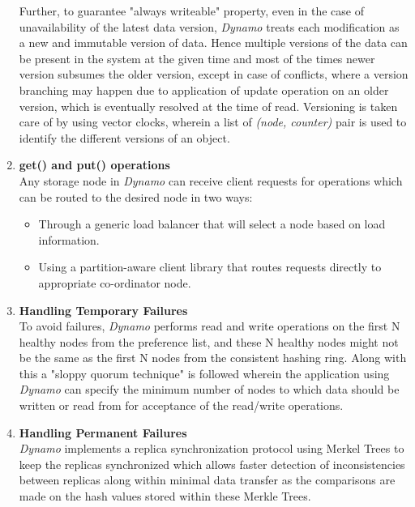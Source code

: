 \documentclass[12pt, a4paper]{article}
\begin{document}
\begin{enumerate}
Further, to guarantee "always writeable" property, even in the case of unavailability of the latest data version, \textit{Dynamo}\cite{DeCandia:2007:DAH:1294261.1294281} treats each modification as a new and immutable version of data. Hence multiple versions of the data can be present in the system at the given time and most of the times newer version subsumes the older version, except in case of conflicts, where a version branching may happen due to application of update operation on an older version, which is eventually resolved at the time of read. 
Versioning is taken care of by using vector clocks, wherein a list of \textit{(node, counter)} pair is used to identify the different versions of an object.\par

\item \textbf{get() and put() operations}\\
Any storage node in \textit{Dynamo}\cite{DeCandia:2007:DAH:1294261.1294281} can receive client requests for operations which can be routed to the desired node in two ways:
        \begin{itemize}
                \setlength\itemsep{0em}
                \item Through a generic load balancer that will select a node based on load information.
                \item Using a partition-aware client library that routes requests directly to appropriate co-ordinator node.
        \end{itemize}

\item \textbf{Handling Temporary Failures}\\
To avoid failures, \textit{Dynamo}\cite{DeCandia:2007:DAH:1294261.1294281} performs read and write operations on the first N healthy nodes from the preference list, and these N healthy nodes might not be the same as the first N nodes from the consistent hashing ring. Along with this a "sloppy quorum technique" is followed wherein the application using \textit{Dynamo}\cite{DeCandia:2007:DAH:1294261.1294281} can specify the minimum number of nodes to which data should be written or read from for acceptance of the read/write operations.

\item \textbf{Handling Permanent Failures}\\
\textit{Dynamo}\cite{DeCandia:2007:DAH:1294261.1294281} implements a replica synchronization protocol using Merkel Trees to keep the replicas synchronized which allows faster detection of inconsistencies between replicas along within minimal data transfer as the comparisons are made on the hash values stored within these Merkle Trees.


\end{enumerate}
\end{document}
